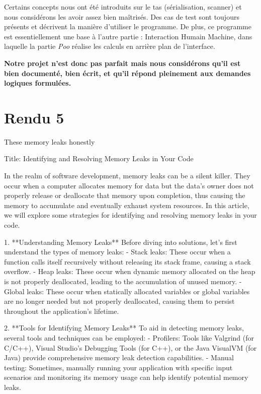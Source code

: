 \documentclass{mytex}
\begin{document}
Certains concepts nous ont été introduits sur le tas (sérialisation, scanner) et nous considérons les avoir assez bien maîtrisés. Des cas de test sont toujours présents et décrivent la manière d'utiliser le programme. De plus, ce programme est essentiellement une base à l'autre partie : Interaction Humain Machine, dans laquelle la partie \textit{Poo} réalise les calculs en arrière plan de l'interface.

\textbf{Notre projet n'est donc pas parfait mais nous considérons qu'il est bien documenté, bien écrit, et qu'il répond pleinement aux demandes logiques formulées.}

\section{Rendu 5}

These memory leaks honestly

Title: Identifying and Resolving Memory Leaks in Your Code

In the realm of software development, memory leaks can be a silent killer. They occur when a computer allocates memory for data but the data's owner does not properly release or deallocate that memory upon completion, thus causing the memory to accumulate and eventually exhaust system resources. In this article, we will explore some strategies for identifying and resolving memory leaks in your code.

1. **Understanding Memory Leaks**
   Before diving into solutions, let's first understand the types of memory leaks:
   - Stack leaks: These occur when a function calls itself recursively without releasing its stack frame, causing a stack overflow.
   - Heap leaks: These occur when dynamic memory allocated on the heap is not properly deallocated, leading to the accumulation of unused memory.
   - Global leaks: These occur when statically allocated variables or global variables are no longer needed but not properly deallocated, causing them to persist throughout the application's lifetime.

2. **Tools for Identifying Memory Leaks**
   To aid in detecting memory leaks, several tools and techniques can be employed:
   - Profilers: Tools like Valgrind (for C/C++), Visual Studio's Debugging Tools (for C++), or the Java VisualVM (for Java) provide comprehensive memory leak detection capabilities.
   - Manual testing: Sometimes, manually running your application with specific input scenarios and monitoring its memory usage can help identify potential memory leaks.
\end{document}
